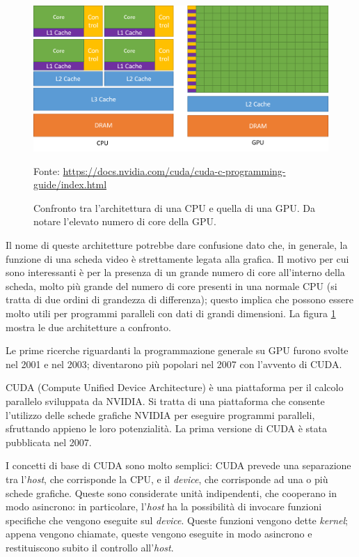 \documentclass[12pt,a4paper,openright,twoside]{report}
\newcommand{\source}[1]{\vspace{-10pt} \caption*{\scriptsize Fonte: {#1}} }
\begin{document}
\begin{figure}[h]
    \centering
    \includegraphics[width=\textwidth]{cpu-gpu-comparison.png}
    \caption[Confronto tra CPU e GPU]{Confronto tra l'architettura di una CPU e quella di una GPU. Da notare l'elevato numero di core della GPU.}
    \source{\url{https://docs.nvidia.com/cuda/cuda-c-programming-guide/index.html}}
    \label{img:cpu-gpu-comparison}
\end{figure}

Il nome di queste architetture potrebbe dare confusione dato che, in generale, la funzione di una scheda video è strettamente legata alla grafica. Il motivo per cui sono interessanti è per la presenza di un grande numero di core all'interno della scheda, molto più grande del numero di core presenti in una normale CPU (si tratta di due ordini di grandezza di differenza); questo implica che possono essere molto utili per programmi paralleli con dati di grandi dimensioni. La figura \ref{img:cpu-gpu-comparison} mostra le due architetture a confronto.

Le prime ricerche riguardanti la programmazione generale su GPU furono svolte nel 2001 e nel 2003; diventarono più popolari nel 2007 con l'avvento di CUDA.

CUDA (Compute Unified Device Architecture) è una piattaforma per il calcolo parallelo sviluppata da NVIDIA. Si tratta di una piattaforma che consente l'utilizzo delle schede grafiche NVIDIA per eseguire programmi paralleli, sfruttando appieno le loro potenzialità. La prima versione di CUDA è stata pubblicata nel 2007.

I concetti di base di CUDA sono molto semplici: CUDA prevede una separazione tra l'\textit{host}, che corrisponde la CPU, e il \textit{device}, che corrisponde ad una o più schede grafiche. Queste sono considerate unità indipendenti, che cooperano in modo asincrono: in particolare, l'\textit{host} ha la possibilità di invocare funzioni specifiche che vengono eseguite sul \textit{device}. Queste funzioni vengono dette \textit{kernel}; appena vengono chiamate, queste vengono eseguite in modo asincrono e restituiscono subito il controllo all'\textit{host}.
\end{document}
